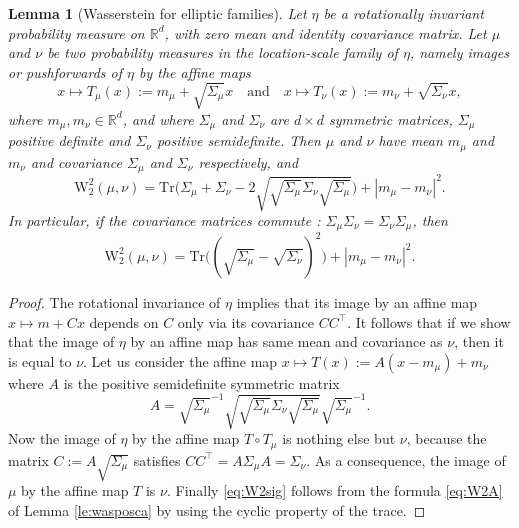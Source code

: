 \documentclass[10pt,reqno]{amsart}
\numberwithin{equation}{section}
\newtheorem{lemma}[theorem]{Lemma}%
\begin{document}
\begin{lemma}[Wasserstein for elliptic families]\label{rk:wasell}
  Let $\eta$ be a rotationally invariant probability measure on $\mathbb{R}^d$,
  with zero mean and identity covariance matrix. Let 
  $\mu$ and $\nu$ be two probability measures in the location-scale family of $\eta$, namely
  images or pushforwards of $\eta$ by the affine maps
  \begin{equation}
    x\mapsto T_\mu(x):=m_\mu+\sqrt{\Sigma_\mu}x
    \quad\text{and}\quad
    x\mapsto T_\nu(x):=m_\nu+\sqrt{\Sigma_\nu}x,
  \end{equation}
  where $m_\mu,m_\nu\in\mathbb{R}^d$, and where $\Sigma_\mu$ and $\Sigma_\nu$ are $d\times d$ symmetric
  matrices, $\Sigma_\mu$ positive definite and $\Sigma_\nu$ positive semidefinite. Then $\mu$ and $\nu$ have mean $m_\mu$ and $m_\nu$ and covariance $\Sigma_\mu$ and $\Sigma_\nu$ respectively, and
  \begin{equation}\label{eq:W2sig}
    \mathrm{W}_2^2(\mu,\nu)
    =\mathrm{Tr}\Bigr(\Sigma_\mu+\Sigma_\nu-2\sqrt{\sqrt{\Sigma_\mu}\Sigma_\nu\sqrt{\Sigma_\mu}}\Bigr)+|m_\mu-m_\nu|^2.
  \end{equation}
  In particular, if the covariance matrices commute : $\Sigma_\mu\Sigma_\nu=\Sigma_\nu\Sigma_\mu$, then 
  \begin{equation}
    \mathrm{W}_2^2(\mu,\nu)
    =\mathrm{Tr}\bigr((\sqrt{\Sigma_\mu}-\sqrt{\Sigma_\nu})^2\bigr)+|m_\mu-m_\nu|^2.
 \end{equation}  
\end{lemma}

\begin{proof}
  The rotational invariance of $\eta$ implies that its image by an affine map $x\mapsto m+Cx$ depends on $C$ only via its covariance $CC^\top$. It follows that if we show that the image of $\eta$ by an affine map has same mean and covariance as $\nu$, then it is equal to $\nu$. Let us consider the affine map $x\mapsto T(x):=A(x-m_\mu)+m_\nu$ where $A$ is the positive semidefinite symmetric matrix
  \begin{equation}\label{eq:A}
      A=\sqrt{\Sigma_\mu}^{-1}\sqrt{\sqrt{\Sigma_\mu}\Sigma_\nu\sqrt{\Sigma_\mu}}\sqrt{\Sigma_\mu}^{-1}.
  \end{equation}
  Now the image of $\eta$ by the affine map $T\circ T_\mu$ is nothing else but $\nu$, because the matrix $C:=A\sqrt{\Sigma_\mu}$ satisfies $CC^\top=A\Sigma_\mu A=\Sigma_\nu$. As a consequence, the image of $\mu$ by the affine map $T$ is $\nu$.  
  Finally \eqref{eq:W2sig} follows from the formula \eqref{eq:W2A} of Lemma \ref{le:wasposca} by using the cyclic property of the trace.
\end{proof}
\end{document}
